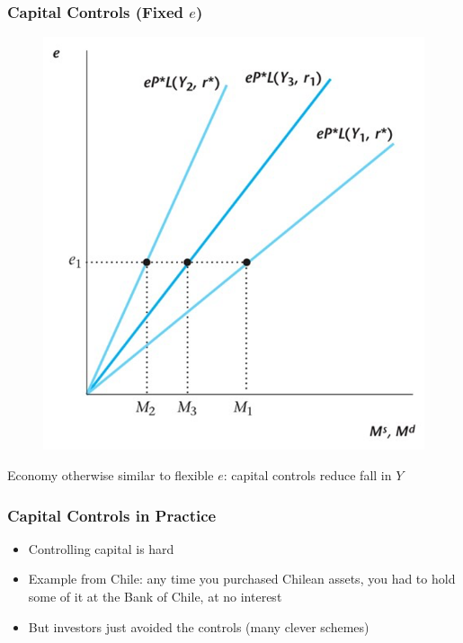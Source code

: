 \documentclass{beamer}
\begin{document}
\begin{frame}
\frametitle[alignment=center]{Capital Controls (Fixed $e$)}
\begin{figure}
\centering
\includegraphics[scale=0.5]{Figures/W_Fig_17pt12.png}
\end{figure}
Economy otherwise similar to flexible $e$: capital controls reduce fall in $Y$
\end{frame}


\begin{frame}
\frametitle[alignment=center]{Capital Controls in Practice}
\begin{itemize}
\item Controlling capital is hard
\bigskip
\item  Example from Chile:  any time you purchased Chilean assets, you had to hold some of it at the Bank of Chile, at no interest
\bigskip
\item But investors just avoided the controls (many clever schemes)
\end{itemize}
\end{frame}
\end{document}
